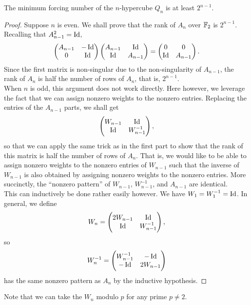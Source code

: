 \begin{flem}
	The minimum forcing number of the $n$-hypercube $Q_n$ is at least $2^{n-1}$.
\end{flem}
\begin{proof}
	Suppose $n$ is even. We shall prove that the rank of $A_n$ over $\mathbb{F}_2$ is $2^{n-1}$. Recalling that $A_{n-1}^2 = \operatorname{Id}$,
	\[ \begin{pmatrix} A_{n-1} & -\operatorname{Id} \\ 0 & \operatorname{Id} \end{pmatrix} \begin{pmatrix} A_{n-1} & \operatorname{Id} \\ \operatorname{Id} & A_{n-1} \end{pmatrix} = \begin{pmatrix} 0 & 0 \\ \operatorname{Id} & A_{n-1} \end{pmatrix}.  \]
	Since the first matrix is non-singular due to the non-singularity of $A_{n-1}$, the rank of $A_n$ is half the number of rows of $A_n$, that is, $2^{n-1}$.\\

	When $n$ is odd, this argument does not work directly. Here however, we leverage the fact that we can assign nonzero weights to the nonzero entries. Replacing the entries of the $A_{n-1}$ parts, we shall get
	\[ \begin{pmatrix} W_{n-1} & \operatorname{Id} \\ \operatorname{Id} & W_{n-1}^{-1} \end{pmatrix}, \]
	so that we can apply the same trick as in the first part to show that the rank of this matrix is half the number of rows of $A_n$.
	That is, we would like to be able to assign nonzero weights to the nonzero entries of $W_{n-1}$ such that the inverse of $W_{n-1}$ is also obtained by assigning nonzero weights to the nonzero entries. More succinctly, the ``nonzero pattern'' of $W_{n-1}$, $W_{n-1}^{-1}$, and $A_{n-1}$ are identical.\\
	This can inductively be done rather easily however. We have $W_1 = W_1^{-1} = \operatorname{Id}$. In general, we define
	\[ W_n = \begin{pmatrix} 2W_{n-1} & \operatorname{Id} \\ \operatorname{Id} & W_{n-1}^{-1} \end{pmatrix}, \]
	so
	\[ W_n^{-1} = \begin{pmatrix} W_{n-1}^{-1} & -\operatorname{Id} \\ -\operatorname{Id} & 2W_{n-1} \end{pmatrix} \]
	has the same nonzero pattern as $A_n$ by the inductive hypothesis.
\end{proof}
Note that we can take the $W_n$ modulo $p$ for any prime $p \ne 2$.\\

